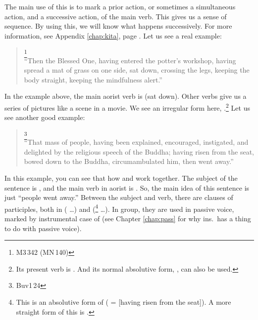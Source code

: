 The main use of this is to mark a prior action, or sometimes a simultaneous action, and a successive action, of the main verb. This gives us a sense of sequence. By using this, we will know what happens successively. For more information, see Appendix \ref{chap:kita}, page \pageref{pacck9:tuna}. Let us see a real example:

\begin{quote}
\footnote{M3\,342 (MN\,140)}\\
``Then the Blessed One, having entered the potter's workshop, having spread a mat of grass on one side, sat down, crossing the legs, keeping the body straight, keeping the mindfulness alert.''\\
\end{quote}

In the example above, the main aorist verb is  (sat down). Other  verbs give us a series of pictures like a scene in a movie. We see an irregular form here, .\footnote{Its present verb is . And its normal absolutive form, , can also be used.} Let us see another good example: 
 
\begin{quote}
\footnote{Buv1\,24}\\
``That mass of people, having been explained, encouraged, instigated, and delighted by the religious speech of the Buddha; having risen from the seat, bowed down to the Buddha, circumambulated him, then went away.''\\
\end{quote}

In this example, you can see that how  and  work together. The subject of the sentence is , and the main verb in aorist is . So, the main idea of this sentence is just ``people went away.'' Between the subject and verb, there are clauses of participles, both in  ( \ldots {}) and  (\footnote{This is an absolutive form of  ( =  [having risen from the seat]). A more straight form of this is .} \ldots {}). In  group, they are used in passive voice, marked by instrumental case of  (see Chapter \ref{chap:pass} for why ins.\ has a thing to do with passive voice).

